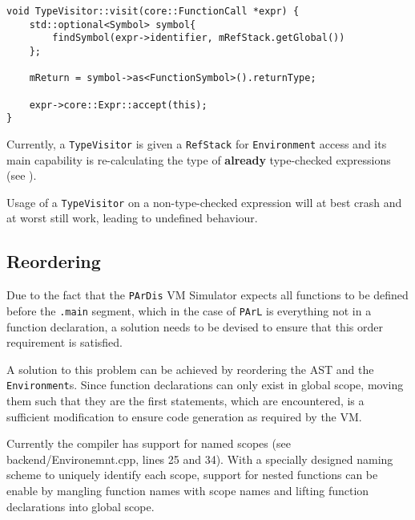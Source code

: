 \begin{lstlisting}[caption={The \texttt{visit(FunctionCall *)}
method in the \texttt{TypeVisitor} class
(ir\_gen/TypeVisitor.cpp).}, label=lst:recomputefunctype]
void TypeVisitor::visit(core::FunctionCall *expr) {
    std::optional<Symbol> symbol{
        findSymbol(expr->identifier, mRefStack.getGlobal())
    };

    mReturn = symbol->as<FunctionSymbol>().returnType;

    expr->core::Expr::accept(this);
}
\end{lstlisting}

Currently, a \texttt{TypeVisitor} is given a \texttt{RefStack}
for \texttt{Environment} access and its main capability is
re-calculating the type of \textbf{already} type-checked
expressions (see ).

\begin{marker}
Usage of a \texttt{TypeVisitor} on a non-type-checked expression
will at best crash and at worst still work, leading to undefined
behaviour.
\end{marker}

\subsection{Reordering}\label{sss:reordersec}

Due to the fact that the \texttt{PArDis} VM Simulator expects
all functions to be defined before the \texttt{.main} segment,
which in the case of \texttt{PArL} is everything not in a
function declaration, a solution needs to be devised to ensure
that this order requirement is satisfied.

A solution to this problem can be achieved by reordering the AST
and the \\ \texttt{Environment}s. Since function declarations can
only exist in global scope, moving them such that they are the
first statements, which are encountered, is a sufficient
modification to ensure code generation as required by the VM.

\begin{todo}
Currently the compiler has support for named scopes (see
backend/Environemnt.cpp, lines 25 and 34). With a specially
designed naming scheme to uniquely identify each scope, support
for nested functions can be enable by mangling function names
with scope names and lifting function declarations into global
scope.
\end{todo}

